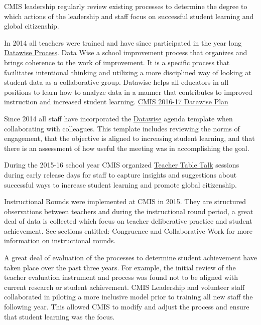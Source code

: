 \begin{findings}
CMIS leadership regularly review existing processes to determine the degree to which actions of the leadership and staff focus on successful student learning and global citizenship.

In 2014 all teachers were trained and have since participated in the year long \href{https://drive.google.com/a/cmis.ac.th/file/d/0B71_pYxcTLo-OExlV0Y5UVFBNVU/view?usp=sharing}{Datawise Process}. Data Wise a school improvement process that organizes and brings coherence to the work of improvement. It is a specific process that facilitates intentional thinking and utilizing a more disciplined way of looking at student data as a collaborative group. Datawise helps all educators in all positions to learn how to analyze data in a manner that contributes to improved instruction and increased student learning. \href{https://docs.google.com/document/d/1TmnCp5qZiZAUMnUmaU32PBn2UGvCMVtFO8r5OsxwNo4/edit}{CMIS 2016-17 Datawise Plan}

Since 2014 all staff  have incorporated the \href{https://docs.google.com/a/cmis.ac.th/document/d/1IFIRIT2wAu1GF2yZ5FSSOdFB3yBKxzx_eCZhdFtroC0/edit?usp=sharing}{Datawise} agenda template when collaborating with colleagues. This template includes reviewing the norms of engagement, that the objective is aligned to increasing student learning, and that there is an assessment of how useful the meeting was in accomplishing the goal.

During the 2015-16 school year CMIS organized \href{https://drive.google.com/a/cmis.ac.th/file/d/0ByVFfrm0zfolbHNvSWhVWmJYU3M/view?usp=sharing}{Teacher Table Talk} sessions during early release days for staff to capture insights and suggestions about successful ways to increase student learning and promote global citizenship.


Instructional Rounds were implemented at CMIS in 2015. They are structured observations between teachers and during the instructional round period, a great deal of data is collected which focus on teacher deliberative practice and student achievement. See sections entitled: Congruence and Collaborative Work for more information on instructional rounds. 


A great deal of evaluation of the processes to determine student achievement have taken place over the past three years. For example, the initial review of the teacher evaluation instrument and process was found not to be aligned with current research or student achievement. CMIS Leadership and volunteer staff collaborated in piloting a more inclusive model prior to training all new staff the following year. This allowed CMIS to modify and adjust the process and ensure that student learning was the focus. 


\end{findings}
